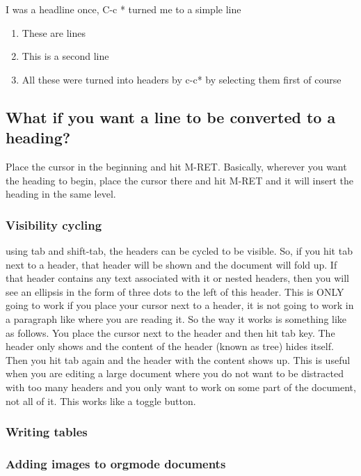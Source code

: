 \documentclass[11pt]{article}
\begin{document}
I was a headline once, C-c * turned me to a simple line

\begin{enumerate}
\item These are lines
\label{sec:org15b50fe}
\item This is a second line
\label{sec:orgfa27682}
\item All these were turned into headers by c-c* by selecting them first of course
\label{sec:orge223b16}
\end{enumerate}

\subsection{What if you want a line to be converted to a heading?}
\label{sec:orgba48ef1}
Place the cursor in the beginning and hit M-RET. Basically, wherever you want the heading to begin, place the cursor there and hit M-RET and it will insert the heading in the same level. 

\subsubsection{Visibility cycling}
\label{sec:org32ef752}
using tab and shift-tab, the headers can be cycled to be visible. So, if you hit tab next to a header, that header will be shown and the document will fold up. If that header contains any text associated with it or nested headers, then you will see an ellipsis in the form of three dots to the left of this header. This is ONLY going to work if you place your cursor next to a header, it is not going to work in a paragraph like where you are reading it.
So the way it works is something like as follows. You place the cursor next to the header and then hit tab key. The header only shows and the content of the header (known as tree) hides itself. Then you hit tab again and the header with the content shows up. This is useful when you are editing a large document where you do not want to be distracted with too many headers and you only want to work on some part of the document, not all of it. This works like a toggle button.


\subsubsection{Writing tables}
\label{sec:org758f716}

\subsubsection{Adding images to orgmode documents}
\label{sec:org2f07a4c}
\end{document}

